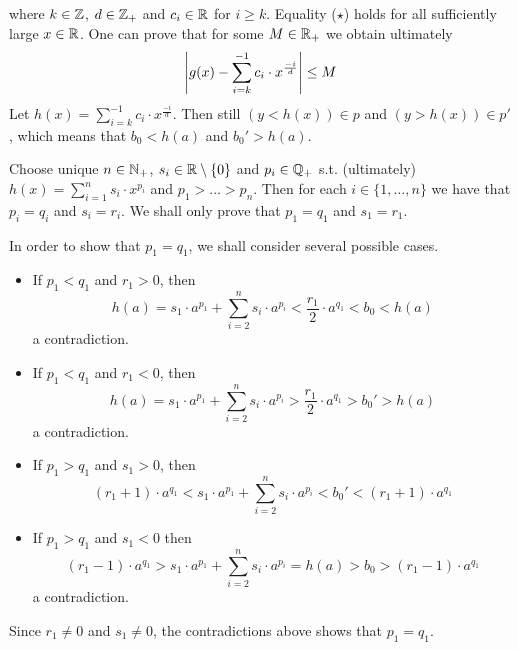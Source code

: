 \documentclass[11pt]{article}
\begin{document}
\begin{itemize}
where \(k\in\mathbb{Z}\), \(d\in\mathbb{Z}_+\) and \(c_i\in\mathbb{R}\) for \(i\ge k\). Equality (\(\star\)) holds for all sufficiently
large \(x\in\mathbb{R}\). One can prove that for some \(M\in\mathbb{R}_+\) we obtain ultimately
\begin{equation*}
\abs{g(x)-\sum_{i=k}^{-1}c_i\cdot x^{\frac{-i}{d}}}\le M
\end{equation*}
Let \(h(x)=\sum_{i=k}^{-1}c_i\cdot x^{\frac{-i}{d}}\). Then still \((y<h(x))\in p\)
and \((y>h(x))\in p'\), which means that \(b_0<h(a)\) and \(b_0'>h(a)\).

Choose unique \(n\in\mathbb{N}_+\), \(s_i\in\mathbb{R}\setminus\{0\}\) and \(p_i\in\mathbb{Q}_+\) s.t.
(ultimately) \(h(x)=\sum_{i=1}^ns_i\cdot x^{p_i}\) and \(p_1>\dots>p_n\). Then for each \(i\in\{1,\dots,n\}\) we have
that \(p_i=q_i\) and \(s_i=r_i\). We shall only prove that \(p_1=q_1\) and \(s_1=r_1\).

In order to show that \(p_1=q_1\), we shall consider several possible cases.
\begin{itemize}
\item If \(p_1<q_1\) and \(r_1>0\), then
\begin{equation*}
h(a)=s_1\cdot a^{p_1}+\sum_{i=2}^ns_i\cdot a^{p_i}<\frac{r_1}{2}\cdot a^{q_1}<b_0<h(a)
\end{equation*}
a contradiction.
\item If \(p_1<q_1\) and \(r_1<0\), then
\begin{equation*}
h(a)=s_1\cdot a^{p_1}+\sum_{i=2}^ns_i\cdot a^{p_i}>\frac{r_1}{2}\cdot a^{q_1}>b_0'>h(a)
\end{equation*}
a contradiction.
\item If \(p_1>q_1\) and \(s_1>0\), then
\begin{equation*}
(r_1+1)\cdot a^{q_1}<s_1\cdot a^{p_1}+\sum_{i=2}^ns_i\cdot a^{p_i}<b_0'<(r_1+1)\cdot a^{q_1}
\end{equation*}
\item If \(p_1>q_1\) and \(s_1<0\) then
\begin{equation*}
(r_1-1)\cdot a^{q_1}>s_1\cdot a^{p_1}+\sum_{i=2}^ns_i\cdot a^{p_i}=h(a)>b_0>(r_1-1)\cdot a^{q_1}
\end{equation*}
a contradiction.
\end{itemize}
Since \(r_1\neq 0\) and \(s_1\neq 0\), the contradictions above shows that \(p_1=q_1\).


\end{itemize}
\end{document}
